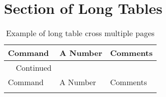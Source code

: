 \section{Section of Long Tables}
\lipsum[6]
\begin{SingleSpace}
	\begin{longtable}{>{\ttfamily}m{}m{}m{}} 
		\caption{Example of long table cross multiple pages}
		\label{tab:long} \\
				
		\toprule
		Command           & A Number & Comments         \\				
		\midrule
		
		\endfirsthead
				
		\normalfont\tablename~\thetable{}~Continued\\
		\toprule
		Command           & A Number & Comments         \\				
		\midrule
		
		\endhead
				
		\bottomrule		
		\endfoot
		
		\endlastfoot
			

\end{longtable}
\end{SingleSpace}
